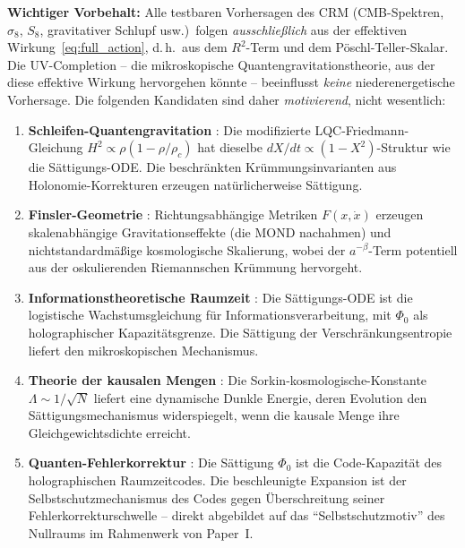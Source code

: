 \documentclass[11pt,a4paper]{article}
\begin{document}
\textbf{Wichtiger Vorbehalt:} Alle testbaren Vorhersagen des CRM (CMB-Spektren, $\sigma_8$, $S_8$, gravitativer Schlupf usw.)\ folgen \textit{ausschlie\ss lich} aus der effektiven Wirkung~\eqref{eq:full_action}, d.\,h.\ aus dem $R^2$-Term und dem P\"oschl-Teller-Skalar. Die UV-Completion -- die mikroskopische Quantengravitationstheorie, aus der diese effektive Wirkung hervorgehen k\"onnte -- beeinflusst \textit{keine} niederenergetische Vorhersage. Die folgenden Kandidaten sind daher \textit{motivierend}, nicht wesentlich:

\begin{enumerate}
\item \textbf{Schleifen-Quantengravitation} \cite{Rovelli2004}: Die modifizierte LQC-Friedmann-Gleichung $H^2 \propto \rho(1 - \rho/\rho_c)$ hat dieselbe $dX/dt \propto (1-X^2)$-Struktur wie die S\"attigungs-ODE. Die beschr\"ankten Kr\"ummungsinvarianten aus Holonomie-Korrekturen erzeugen nat\"urlicherweise S\"attigung.

\item \textbf{Finsler-Geometrie} \cite{Bao2000}: Richtungsabh\"angige Metriken $F(x, \dot{x})$ erzeugen skalenabh\"angige Gravitationseffekte (die MOND nachahmen) und nichtstandardm\"a\ss ige kosmologische Skalierung, wobei der $a^{-\beta}$-Term potentiell aus der oskulierenden Riemannschen Kr\"ummung hervorgeht.

\item \textbf{Informationstheoretische Raumzeit} \cite{Bousso2002}: Die S\"attigungs-ODE ist die logistische Wachstumsgleichung f\"ur Informationsverarbeitung, mit $\Phi_0$ als holographischer Kapazit\"atsgrenze. Die S\"attigung der Verschr\"ankungsentropie \cite{VanRaamsdonk2010} liefert den mikroskopischen Mechanismus.

\item \textbf{Theorie der kausalen Mengen} \cite{Bombelli1987}: Die Sorkin-kosmologische-Konstante $\Lambda \sim 1/\sqrt{N}$ liefert eine dynamische Dunkle Energie, deren Evolution den S\"attigungsmechanismus widerspiegelt, wenn die kausale Menge ihre Gleichgewichtsdichte erreicht.

\item \textbf{Quanten-Fehlerkorrektur} \cite{Almheiri2015}: Die S\"attigung $\Phi_0$ ist die Code-Kapazit\"at des holographischen Raumzeitcodes. Die beschleunigte Expansion ist der Selbstschutzmechanismus des Codes gegen \"Uberschreitung seiner Fehlerkorrekturschwelle -- direkt abgebildet auf das "`Selbstschutzmotiv"' des Nullraums im Rahmenwerk von Paper~I.


\end{enumerate}
\end{document}
